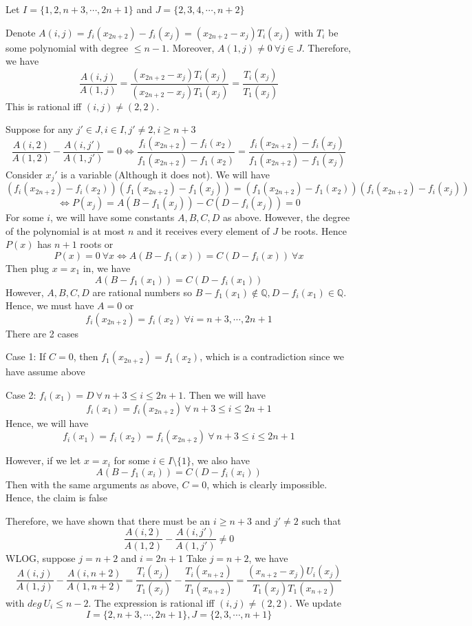 \documentclass[english, 10pt]{article} %
\begin{document}
Let $I=\{1,2,n+3,\cdots,2n+1\}$ and $J=\{2,3,4,\cdots,n+2\}$


Denote $A(i,j)=f_i(x_{2n+2})-f_i(x_j) = (x_{2n+2}-x_j)T_{i}(x_j)$ with $T_i$ be some polynomial with degree $\leq n-1$. Moreover, $A(1,j) \neq 0 \ \forall j \in J$. Therefore, we have
$$\frac{A(i,j)}{A(1,j)} = \frac{(x_{2n+2}-x_j)T_{i}(x_j)}{(x_{2n+2}-x_j)T_1(x_j)} = \frac{T_i(x_j)}{T_1(x_j)}$$
This is rational iff $(i,j) \neq (2,2)$.

Suppose for any $j' \in J, i \in I, j' \neq 2, i \geq n+3$
$$\frac{A(i,2)}{A(1,2)}-\frac{A(i,j')}{A(1,j')}=0 \iff \frac{f_i(x_{2n+2})-f_i(x_2)}{f_1(x_{2n+2})-f_1(x_2)} = \frac{f_i(x_{2n+2})-f_i(x_j)}{f_1(x_{2n+2})-f_1(x_j)}$$
Consider $x_j'$ is a variable (Although it does not). We will have
$$(f_i(x_{2n+2})-f_i(x_2))(f_1(x_{2n+2})-f_1(x_j))=(f_1(x_{2n+2})-f_1(x_2))(f_i(x_{2n+2})-f_i(x_j))$$
$$\iff P(x_j)=A(B-f_1(x_j))-C(D-f_i(x_j))=0$$
For some $i$, we will have some constants $A,B,C,D$ as above. However, the degree of the polynomial is at most $n$ and it receives every element of $J$ be roots. Hence $P(x)$ has $n+1$ roots or
$$P(x)=0 \ \forall x \iff A(B-f_1(x))=C(D-f_i(x)) \ \forall x$$
Then plug $x=x_1$ in, we have
$$A(B-f_1(x_1))=C(D-f_i(x_1))$$
However, $A,B,C,D$ are rational numbers so $B-f_1(x_1) \not \in \mathbb{Q},D-f_i(x_1) \in \mathbb{Q}$. Hence, we must have $A=0$ or
$$f_i(x_{2n+2})=f_i(x_2) \ \forall i=n+3,\cdots,2n+1$$
There are 2 cases

Case 1: If $C=0$, then $f_1(x_{2n+2})=f_1(x_2)$, which is a contradiction since we have assume above

Case 2: $f_i(x_1)=D \ \forall \ n+3 \leq i \leq 2n+1$. Then we will have
$$f_i(x_1)=f_i(x_{2n+2}) \ \forall \ n+3 \leq i \leq 2n+1$$
Hence, we will have
$$f_i(x_1)=f_i(x_2)=f_i(x_{2n+2}) \ \forall \ n+3 \leq i \leq 2n+1$$

However, if we let $x=x_i$ for some $i \in I \setminus \{1\}$, we also have
$$A(B-f_1(x_i))=C(D-f_i(x_i))$$
Then with the same arguments as above, $C=0$, which is clearly impossible. Hence, the claim is false

Therefore, we have shown that there must be an $i \geq n+3$ and $j' \neq 2$ such that
$$\frac{A(i,2)}{A(1,2)}-\frac{A(i,j')}{A(1,j')} \neq 0$$
WLOG, suppose $j=n+2$ and $i=2n+1$
\newpage
Take $j=n+2$, we have
$$\frac{A(i,j)}{A(1,j)}-\frac{A(i,n+2)}{A(1,n+2)}=\frac{T_i(x_j)}{T_1(x_j)}-\frac{T_i(x_{n+2})}{T_1(x_{n+2})}=\frac{(x_{n+2}-x_j)U_i(x_j)}{T_1(x_j)T_1(x_{n+2})}$$
with $deg \ U_i \leq n-2$. The expression is rational iff $(i,j) \neq (2,2)$. We update
$$I=\{2,n+3,\cdots,2n+1\}, J= \{2,3,\cdots,n+1 \}$$
\end{document}
